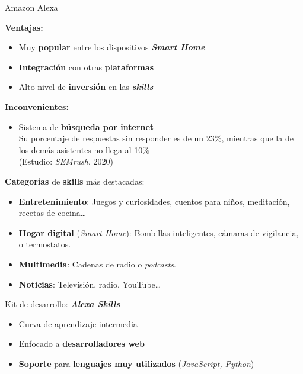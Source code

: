 \documentclass{beamer}
\begin{document}
  \begin{frame}[label=amazon-alexa]{ Amazon Alexa}
    {
      \textbf{Ventajas:}
      \vspace{1.5em}
      \begin{itemize}
        \setlength\itemsep{1.5em}
        \item Muy \textbf{popular} entre los dispositivos \textbf{\textit{Smart Home}}
        \item \textbf{Integración} con otras \textbf{plataformas}
        \item Alto nivel de \textbf{inversión} en las \textbf{\emph{skills}}
      \end{itemize}
    }
    {
      \textbf{Inconvenientes:}
      \vspace{1.5em}
      \begin{itemize}
        \item Sistema de \textbf{búsqueda por internet}\\
        \vspace{.5em}
        \small Su porcentaje de respuestas sin responder es de un 23\%, mientras que la de los demás asistentes no llega al 10\%\\
        \vspace{.3em}
        \footnotesize(Estudio: \textit{SEMrush}, 2020)
      \end{itemize}
    }
    {
      \textbf{Categorías} de \textbf{skills} más destacadas:
      \vspace{1.5em}
      \begin{itemize}
        \setlength\itemsep{1.5em}
        \item \textbf{Entretenimiento}: Juegos y curiosidades, cuentos para niños, meditación, recetas de cocina\dots
        \item \textbf{Hogar digital} (\textit{Smart Home}): Bombillas inteligentes, cámaras de vigilancia, o termostatos.
        \item \textbf{Multimedia}: Cadenas de radio o \textit{podcasts}.
        \item \textbf{Noticias}: Televisión, radio, YouTube\dots
     \end{itemize}
    }
    {
      Kit de desarrollo: \textbf{\emph{Alexa Skills}}
      \begin{itemize}
        \item Curva de aprendizaje intermedia
        \item Enfocado a \textbf{desarrolladores web}
        \item \textbf{Soporte} para \textbf{lenguajes muy utilizados} (\emph{JavaScript, Python})
      \end{itemize}
    }
  \end{frame}
\end{document}
